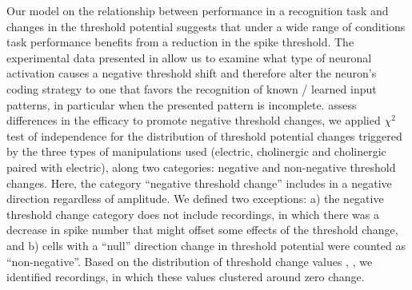 
Our model on the relationship
        between performance in a recognition task and changes in the threshold potential
        suggests that under a wide range of conditions
        task performance benefits from a reduction in the spike threshold.
    The experimental data presented in \cite{Gill2020-wy} allow us to examine
        what type of neuronal activation
        causes a negative threshold shift
        and therefore alter the neuron's coding strategy to one that favors the recognition of known / learned input patterns,
        in particular when the presented pattern is incomplete.
        assess differences in the efficacy to promote negative threshold changes,
        we applied $\chi^2$ test of independence
        for the distribution of threshold potential changes
        triggered by the three types of manipulations used (electric, cholinergic and cholinergic paired with electric),
        along two categories: negative and non-negative threshold changes.
    Here, the category ``negative threshold change'' includes
        in a negative direction regardless of amplitude.
    We defined two exceptions:
        a) the negative threshold change category does not include recordings,
            in which there was a decrease in spike number
                that might offset some effects of the threshold change,
        and b) cells with a ``null'' direction change in threshold potential
            were counted as ``non-negative''.
    Based on the distribution of threshold change values
        ,
        ,
        we identified  recordings,
        in which these  values clustered around zero change.
